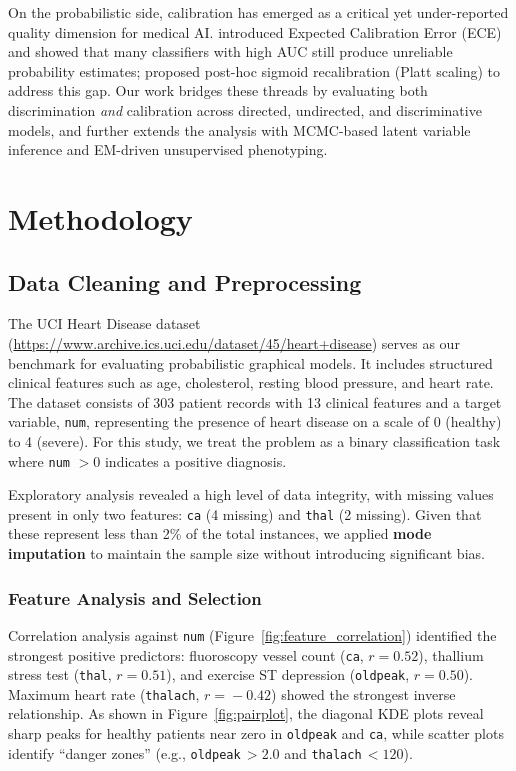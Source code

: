 \documentclass{article}
\begin{document}
On the probabilistic side, calibration has emerged as a critical yet
under-reported quality dimension for medical AI. \citet{naeini2015ece}
introduced Expected Calibration Error (ECE) and showed that many classifiers
with high AUC still produce unreliable probability estimates;
\citet{platt1999scaling} proposed post-hoc sigmoid recalibration (Platt
scaling) to address this gap. Our work bridges these threads by evaluating
both discrimination \emph{and} calibration across directed, undirected, and
discriminative models, and further extends the analysis with MCMC-based
latent variable inference and EM-driven unsupervised phenotyping.


\section{Methodology}

\subsection{Data Cleaning and Preprocessing}

The UCI Heart Disease dataset (\url{https://www.archive.ics.uci.edu/dataset/45/heart+disease}) serves as our benchmark for evaluating probabilistic graphical models. It includes structured clinical features such as age, cholesterol, resting blood pressure, and heart rate. The dataset consists of 303 patient records with 13 clinical features and a target variable, \texttt{num}, representing the presence of heart disease on a scale of 0 (healthy) to 4 (severe). For this study, we treat the problem as a binary classification task where \texttt{num} $> 0$ indicates a positive diagnosis.


Exploratory analysis revealed a high level of data integrity, with missing values present in only two features: \texttt{ca} (4 missing) and \texttt{thal} (2 missing). Given that these represent less than 2\% of the total instances, we applied \textbf{mode imputation} to maintain the sample size without introducing significant bias.

\subsubsection{Feature Analysis and Selection}
Correlation analysis against \texttt{num} (Figure~\ref{fig:feature_correlation}) identified the strongest positive predictors: fluoroscopy vessel count (\texttt{ca}, $r\!=\!0.52$), thallium stress test (\texttt{thal}, $r\!=\!0.51$), and exercise ST depression (\texttt{oldpeak}, $r\!=\!0.50$). Maximum heart rate (\texttt{thalach}, $r\!=\!{-}0.42$) showed the strongest inverse relationship. As shown in Figure~\ref{fig:pairplot}, the diagonal KDE plots reveal sharp peaks for healthy patients near zero in \texttt{oldpeak} and \texttt{ca}, while scatter plots identify ``danger zones'' (e.g., \texttt{oldpeak}\,$>2.0$ and \texttt{thalach}\,$<120$).
\end{document}
